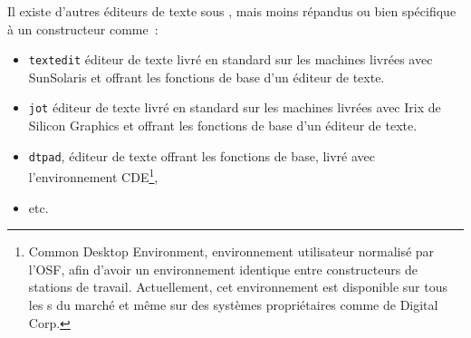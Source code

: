 \begin{remarque}
Il existe d'autres {\'e}diteurs de texte sous {\Unix}, mais moins r{\'e}pandus
ou bien sp{\'e}cifique {\`a} un constructeur comme~:
\begin{itemize}
	\item	{\tt textedit} {\'e}diteur de texte livr{\'e} en standard
			sur les machines livr{\'e}es avec SunSolaris et offrant les
			fonctions de base d'un {\'e}diteur de texte.
	\item	{\tt jot} {\'e}diteur de texte livr{\'e} en standard
			sur les machines livr{\'e}es avec Irix de Silicon Graphics et offrant les
			fonctions de base d'un {\'e}diteur de texte.
	\item	{\tt dtpad}, {\'e}diteur de texte offrant les fonctions de base, livr{\'e}
			avec l'environnement CDE\footnote{Common Desktop Environment,
			environnement utilisateur normalis{\'e} par l'OSF, afin d'avoir un
			environnement identique entre constructeurs de stations de travail.
			Actuellement, cet environnement est disponible sur tous les
			{\Unix}s du march{\'e} et m{\^e}me sur des syst{\`e}mes propri{\'e}taires comme
			{\OpenVMS} de Digital Corp.},
	\item	etc.
\end{itemize}
\end{remarque}
